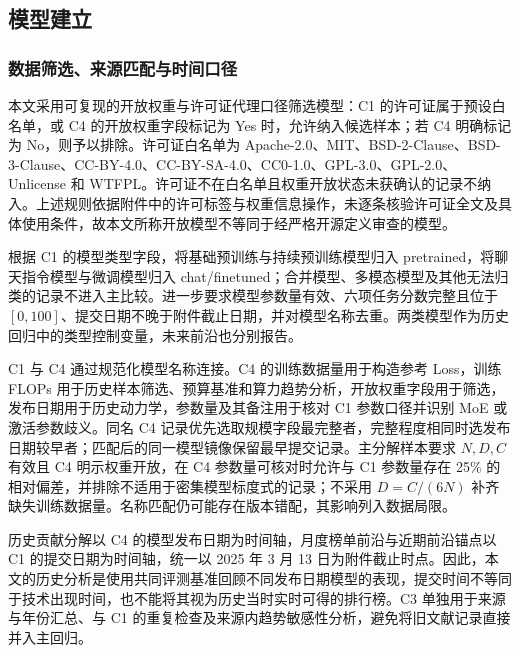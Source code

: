 \documentclass[bwprint]{gmcmthesis}
\numberwithin{equation}{section}
\numberwithin{figure}{section}
\numberwithin{table}{section}
\begin{document}
    \subsection{模型建立}

        \subsubsection{数据筛选、来源匹配与时间口径}
        本文采用可复现的开放权重与许可证代理口径筛选模型：C1 的许可证属于预设白名单，或 C4 的开放权重字段标记为 Yes 时，允许纳入候选样本；若 C4 明确标记为 No，则予以排除。许可证白名单为 Apache-2.0、MIT、BSD-2-Clause、BSD-3-Clause、CC-BY-4.0、CC-BY-SA-4.0、CC0-1.0、GPL-3.0、GPL-2.0、Unlicense 和 WTFPL。许可证不在白名单且权重开放状态未获确认的记录不纳入。上述规则依据附件中的许可标签与权重信息操作，未逐条核验许可证全文及具体使用条件，故本文所称开放模型不等同于经严格开源定义审查的模型。

        根据 C1 的模型类型字段，将基础预训练与持续预训练模型归入 pretrained，将聊天指令模型与微调模型归入 chat/finetuned；合并模型、多模态模型及其他无法归类的记录不进入主比较。进一步要求模型参数量有效、六项任务分数完整且位于 $[0,100]$、提交日期不晚于附件截止日期，并对模型名称去重。两类模型作为历史回归中的类型控制变量，未来前沿也分别报告。

        C1 与 C4 通过规范化模型名称连接。C4 的训练数据量用于构造参考 Loss，训练 FLOPs 用于历史样本筛选、预算基准和算力趋势分析，开放权重字段用于筛选，发布日期用于历史动力学，参数量及其备注用于核对 C1 参数口径并识别 MoE 或激活参数歧义。同名 C4 记录优先选取规模字段最完整者，完整程度相同时选发布日期较早者；匹配后的同一模型镜像保留最早提交记录。主分解样本要求 $N,D,C$ 有效且 C4 明示权重开放，在 C4 参数量可核对时允许与 C1 参数量存在 25\% 的相对偏差，并排除不适用于密集模型标度式的记录；不采用 $D=C/(6N)$ 补齐缺失训练数据量。名称匹配仍可能存在版本错配，其影响列入数据局限。

        历史贡献分解以 C4 的模型发布日期为时间轴，月度榜单前沿与近期前沿锚点以 C1 的提交日期为时间轴，统一以 2025 年 3 月 13 日为附件截止时点。因此，本文的历史分析是使用共同评测基准回顾不同发布日期模型的表现，提交时间不等同于技术出现时间，也不能将其视为历史当时实时可得的排行榜。C3 单独用于来源与年份汇总、与 C1 的重复检查及来源内趋势敏感性分析，避免将旧文献记录直接并入主回归。
\end{document}
